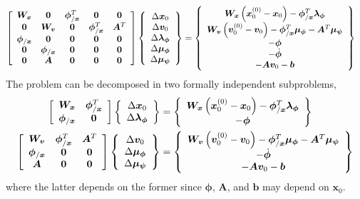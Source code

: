 \documentclass[10pt,fleqn,subeqn]{report}
\newcommand{\T}[1]{\bm{#1}}
\newcommand{\TT}[1]{\bm{#1}}
\begin{document}
\begin{align}
	\sqbr{\matr{ccccc}{
		\TT{W}_{\T{x}} & \TT{0} & \T{\phi}_{/\T{x}}^T & \TT{0} & \TT{0}
		\\
		\TT{0} & \TT{W}_{\T{v}} & \TT{0} & \T{\phi}_{/\T{x}}^T & \TT{A}^T
		\\
		\T{\phi}_{/\T{x}} & \TT{0} & \TT{0} & \TT{0} & \TT{0}
		\\
		\TT{0} & \T{\phi}_{/\T{x}} & \TT{0} & \TT{0} & \TT{0}
		\\
		\TT{0} & \TT{A} & \TT{0} & \TT{0} & \TT{0}
	}}
	\cubr{\cvvect{
		\Delta\T{x}_0
		\\
		\Delta\T{v}_0
		\\
		\Delta\T{\lambda}_{\T{\phi}}
		\\
		\Delta\T{\mu}_{\T{\phi}}
		\\
		\Delta\T{\mu}_{\T{\psi}}
	}}
	&=
	\cubr{\cvvect{
		\TT{W}_{\T{x}} \plbr{\T{x}_0^{(0)} - \T{x}_0} - \T{\phi}_{/\T{x}}^T \T{\lambda}_{\T{\phi}}
		\\
		\TT{W}_{\T{v}} \plbr{\T{v}_0^{(0)} - \T{v}_0} - \T{\phi}_{/\T{x}}^T \T{\mu}_{\T{\phi}} - \TT{A}^T \T{\mu}_{\T{\psi}}
		\\
		-\T{\phi}
		\\
		-\dot{\T{\phi}}
		\\
		-\TT{A} \T{v}_0 - \T{b}
	}}
\end{align}
The problem can be decomposed in two formally independent subproblems,
\begin{align}
	\sqbr{\matr{ccc}{
		\TT{W}_{\T{x}} & \T{\phi}_{/\T{x}}^T
		\\
		\T{\phi}_{/\T{x}} & \TT{0}
	}}
	\cubr{\cvvect{
		\Delta\T{x}_0
		\\
		\Delta\T{\lambda}_{\T{\phi}}
	}}
	&=
	\cubr{\cvvect{
		\TT{W}_{\T{x}} \plbr{\T{x}_0^{(0)} - \T{x}_0} - \T{\phi}_{/\T{x}}^T \T{\lambda}_{\T{\phi}}
		\\
		-\T{\phi}
	}}
	\\
	\sqbr{\matr{ccc}{
		\TT{W}_{\T{v}} & \T{\phi}_{/\T{x}}^T & \TT{A}^T
		\\
		\T{\phi}_{/\T{x}} & \TT{0} & \TT{0}
		\\
		\TT{A} & \TT{0} & \TT{0}
	}}
	\cubr{\cvvect{
		\Delta\T{v}_0
		\\
		\Delta\T{\mu}_{\T{\phi}}
		\\
		\Delta\T{\mu}_{\T{\psi}}
	}}
	&=
	\cubr{\cvvect{
		\TT{W}_{\T{v}} \plbr{\T{v}_0^{(0)} - \T{v}_0} - \T{\phi}_{/\T{x}}^T \T{\mu}_{\T{\phi}} - \TT{A}^T \T{\mu}_{\T{\psi}}
		\\
		-\dot{\T{\phi}}
		\\
		-\TT{A} \T{v}_0 - \T{b}
	}}
\end{align}
where the latter depends on the former since $\T{\phi}$, $\TT{A}$, and $\T{b}$ may depend on $\T{x}_0$.
\end{document}
